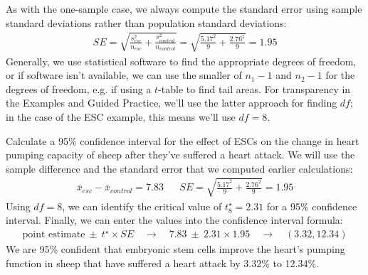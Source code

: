 As with the one-sample case, we always compute the
standard error using sample standard deviations rather
than population standard deviations:
\begin{align*}
SE%
	= \sqrt{\frac{s_{esc}^2}{n_{esc}} + \frac{s_{control}^2}{n_{control}}}
	= \sqrt{\frac{5.17^2}{9} + \frac{2.76^2}{9}} = 1.95
\end{align*}
Generally, we use statistical software to find the appropriate
degrees of freedom, or if software isn't available,
we can use the smaller
of $n_1 - 1$ and $n_2 - 1$ for the degrees of freedom,
e.g. if using a $t$-table to find tail areas.
For transparency in the Examples and Guided Practice,
we'll use the latter approach for finding $df$;
in the case of the ESC example, this means we'll use $df = 8$.

\begin{examplewrap}
\begin{nexample}{Calculate a 95\% confidence interval for the
    effect of ESCs on the change in heart pumping capacity of
    sheep after they've suffered a heart attack.}
  We will use the sample difference and the standard error that 
  we computed earlier calculations:
  \begin{align*}
  \bar{x}_{esc} - \bar{x}_{control} = 7.83
  && SE = \sqrt{\frac{5.17^2}{9} + \frac{2.76^2}{9}} = 1.95
  \end{align*}
  Using $df = 8$, we can identify the
  critical value of $t^{\star}_{8} = 2.31$
  for a 95\% confidence interval.
  Finally, we can enter the values into the confidence
  interval formula:
  \begin{align*}
  \text{point estimate} \ \pm\ t^{\star} \times SE
    \quad\rightarrow\quad 7.83 \ \pm\ 2.31\times 1.95
    \quad\rightarrow\quad (3.32, 12.34)
  \end{align*}
  We are 95\% confident that embryonic stem cells improve
  the heart's pumping function in sheep that have suffered
  a heart attack by 3.32\% to 12.34\%.
  
\end{nexample}
\end{examplewrap}

